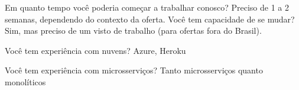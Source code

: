 
\begin{minipage}[t]{0.45\textwidth}


    \begin{entrylist}
        \entry
        {}
        {Em quanto tempo você poderia começar a trabalhar conosco?}
        {}
        {
            Preciso de 1 a 2 semanas, dependendo do contexto da oferta.
        }
        \entry
        {}
        {Você tem capacidade de se mudar?}
        {}
        {
            Sim, mas preciso de um visto de trabalho (para ofertas fora do Brasil).
        }

    \end{entrylist}
\end{minipage}
\hfill
\begin{minipage}[t]{0.45\textwidth}


    \begin{entrylist}
        \entry
        {}
        {Você tem experiência com nuvens?}
        {}
        {
            Azure, Heroku
        }

        \entry
        {}
        {Você tem experiência com microsserviços?}
        {}
        {
            Tanto microsserviços quanto monolíticos
        }
    \end{entrylist}
\end{minipage}
